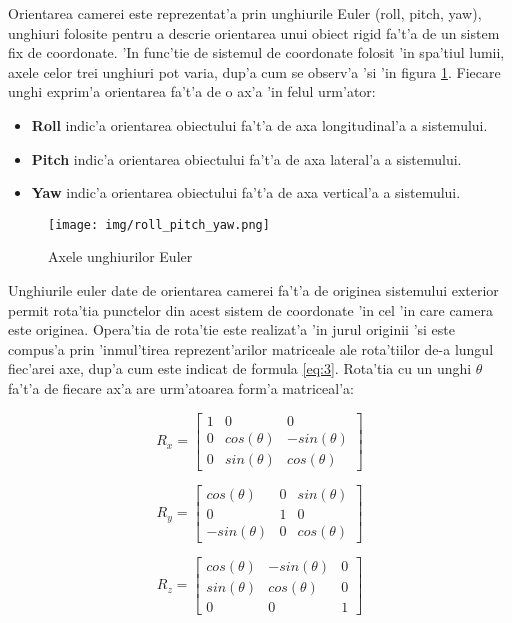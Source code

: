 \documentclass[12pt,a4paper,twoside]{report}
\begin{document}
Orientarea camerei este reprezentat'a prin unghiurile Euler (roll, pitch, yaw), unghiuri folosite pentru a descrie orientarea unui obiect rigid fa't'a de un sistem fix de coordonate. 'In func'tie de sistemul de coordonate folosit 'in spa'tiul lumii, axele celor trei unghiuri pot varia, dup'a cum se observ'a 'si 'in figura \ref{fig:euler_angles}. Fiecare unghi exprim'a orientarea fa't'a de o ax'a 'in felul urm'ator:
\begin{itemize}
  \item \textbf{Roll} indic'a orientarea obiectului fa't'a de axa longitudinal'a a sistemului.
  \item \textbf{Pitch} indic'a orientarea obiectului fa't'a de axa lateral'a a sistemului.
  \item \textbf{Yaw} indic'a orientarea obiectului fa't'a de axa vertical'a a sistemului.
\end{itemize} 

\begin{figure}[H]
  \texttt{[image: img/roll\_pitch\_yaw.png]}
  \centering
  \caption{Axele unghiurilor Euler \protect\footnotemark}
  \label{fig:euler_angles}
\end{figure}

Unghiurile euler date de orientarea camerei fa't'a de originea sistemului exterior permit rota'tia punctelor din acest sistem de coordonate 'in cel 'in care camera este originea. Opera'tia de rota'tie este realizat'a 'in jurul originii 'si este compus'a prin 'inmul'tirea reprezent'arilor matriceale ale rota'tiilor de-a lungul fiec'arei axe, dup'a cum este indicat de formula \ref{eq:3}. Rota'tia cu un unghi $\theta$ fa't'a de fiecare ax'a are urm'atoarea form'a matriceal'a:

\[
R_x = 
	\begin{bmatrix}
	1 & 0 & 0 \\
	0 & cos(\theta) & -sin(\theta)\\
	0 & sin(\theta) & cos(\theta)
	\end{bmatrix}
\]

\[
R_y = 
	\begin{bmatrix}
	cos(\theta) & 0 & sin(\theta)\\
	0 & 1 & 0 \\
	-sin(\theta) & 0 & cos(\theta)
	\end{bmatrix}
\]

\[
R_z = 
	\begin{bmatrix}
	cos(\theta) & -sin(\theta) & 0 \\
	sin(\theta) & cos(\theta) & 0\\
	0 & 0 & 1
	\end{bmatrix}
\]
\end{document}
